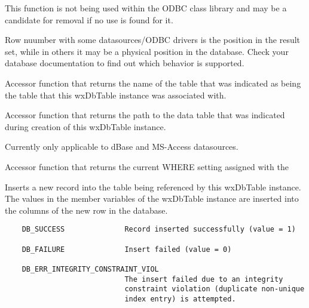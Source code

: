 This function is not being used within the ODBC class library and may be a 
candidate for removal if no use is found for it.

Row nuumber with some datasources/ODBC drivers is the position in the result set, 
while in others it may be a physical position in the database.  Check your 
database documentation to find out which behavior is supported.


\label{wxdbtablegettablename}


Accessor function that returns the name of the table that was indicated 
as being the table that this wxDbTable instance was associated with.


\label{wxdbtablegettablepath}


Accessor function that returns the path to the data table that was indicated 
during creation of this wxDbTable instance.


Currently only applicable to dBase and MS-Access datasources.


\label{wxdbtablegetwhereclause}


Accessor function that returns the current WHERE setting assigned with the 




\label{wxdbtableinsert}


Inserts a new record into the table being referenced by this wxDbTable 
instance.  The values in the member variables of the wxDbTable instance are 
inserted into the columns of the new row in the database.
 

\begin{verbatim}
    DB_SUCCESS              Record inserted successfully (value = 1)

    DB_FAILURE              Insert failed (value = 0)

    DB_ERR_INTEGRITY_CONSTRAINT_VIOL    
                            The insert failed due to an integrity
                            constraint violation (duplicate non-unique
                            index entry) is attempted.
\end{verbatim}

